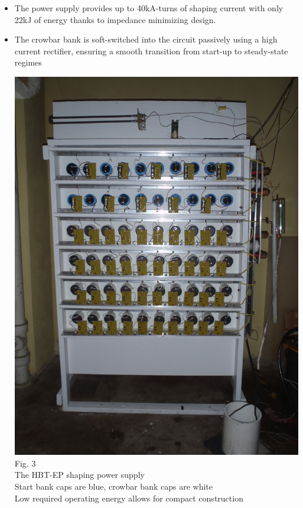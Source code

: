 \documentclass{article}
\begin{document}
\begin{multicols}{5}
\begin{itemize}
\item The power supply provides up to 40kA-turns of shaping current with only 22kJ of energy thanks to impedance minimizing design.
\item The crowbar bank is soft-switched into the circuit passively using a high current rectifier, ensuring a smooth transition from start-up to steady-state regimes\\
\vspace{.25in}
\begin{center}
\includegraphics[width=0.9\columnwidth]{Cap_bank.jpg}\\
Fig. 3\\
The HBT-EP shaping power supply\\
Start bank caps are blue, crowbar bank caps are white\\
Low required operating energy allows for compact construction\\
\vspace{.25in}
\end{center}

\end{itemize}
\end{multicols}
\end{document}
